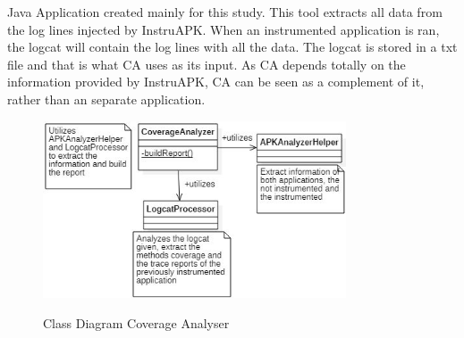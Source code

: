 Java Application created mainly for this study. This tool extracts all data from the log lines injected by InstruAPK. When an instrumented application is ran, the logcat will contain the log lines with all the data. The logcat is stored in a txt file and that is what CA uses as its input. As CA depends totally on the information provided by InstruAPK, CA can be seen as a complement of it, rather than an separate application.

\begin{figure}[h]
\centering
\includegraphics[width=0.8\textwidth]{../Figures/ClassDiagramCA.jpg}
\label{fig:ca}
\caption{Class Diagram Coverage Analyser}
\end{figure}
